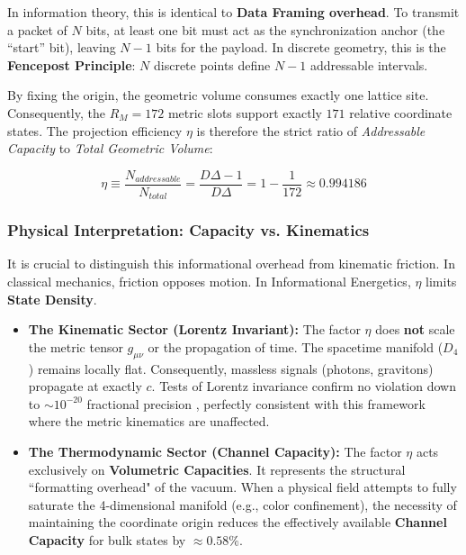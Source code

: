 In information theory, this is identical to \textbf{Data Framing overhead}. To transmit a packet of $N$ bits, at least one bit must act as the synchronization anchor (the ``start'' bit), leaving $N-1$ bits for the payload. In discrete geometry, this is the \textbf{Fencepost Principle}: $N$ discrete points define $N-1$ addressable intervals.

By fixing the origin, the geometric volume consumes exactly one lattice site. Consequently, the $R_M = 172$ metric slots support exactly $171$ relative coordinate states. The projection efficiency $\eta$ is therefore the strict ratio of \textit{Addressable Capacity} to \textit{Total Geometric Volume}:

\begin{equation}
\label{eq:manifold_efficiency}
\eta \equiv \frac{N_{addressable}}{N_{total}} = \frac{D\Delta - 1}{D\Delta} = 1 - \frac{1}{172} \approx 0.994186
\end{equation}

\subsubsection{Physical Interpretation: Capacity vs. Kinematics}

It is crucial to distinguish this informational overhead from kinematic friction. In classical mechanics, friction opposes motion. In Informational Energetics, $\eta$ limits \textbf{State Density}.

\begin{itemize}
    \item \textbf{The Kinematic Sector (Lorentz Invariant):} The factor $\eta$ does \textbf{not} scale the metric tensor $g_{\mu\nu}$ or the propagation of time. The spacetime manifold ($D_4$) remains locally flat. Consequently, massless signals (photons, gravitons) propagate at exactly $c$. Tests of Lorentz invariance confirm no violation down to $\sim 10^{-20}$ fractional precision \cite{kostelecky_data_2011}, perfectly consistent with this framework where the metric kinematics are unaffected.
    
    \item \textbf{The Thermodynamic Sector (Channel Capacity):} The factor $\eta$ acts exclusively on \textbf{Volumetric Capacities}. It represents the structural ``formatting overhead" of the vacuum. When a physical field attempts to fully saturate the 4-dimensional manifold (e.g., color confinement), the necessity of maintaining the coordinate origin reduces the effectively available \textbf{Channel Capacity} for bulk states by $\approx 0.58\%$.
\end{itemize}

